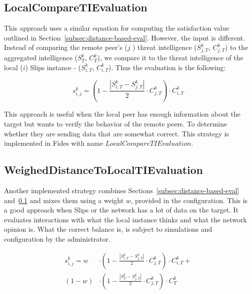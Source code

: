 \subsection{LocalCompareTIEvaluation}
\label{subsec:use-local-threat-to-evaluate}
This approach uses a similar equation for computing the satisfaction value outlined in Section~\ref{subsec:distance-based-eval}. However, the input is different. Instead of comparing the remote peer's ($j$ ) threat intelligence ($S^{k}_{j, T}$, $C^{k}_{j, T}$) to the aggregated intelligence ($S^{k}_{T}$, $C^{k}_{T}$), we compare it to the threat intelligence of the local ($i$) Slips instance - ($S^{k}_{i, T}$, $C^{k}_{i, T}$). Thus the evaluation is the following:

\begin{equation}
s^{k}_{i, j} = \left(1 - \frac{|{S}^{k}_{i, T} - S^{k}_{j, T}|}{2} \cdot C^{k}_{j, T}\right) \cdot C^{k}_{i, T}
\end{equation}

This approach is useful when the local peer has enough information about the target but wants to verify the behavior of the remote peers.
To determine whether they are sending data that are somewhat correct. This strategy is implemented in Fides with name $LocalCompareTIEvaluation$.

\subsection{WeighedDistanceToLocalTIEvaluation}
\label{subsec:weigh-local-opinion-with-aggregated-one}
Another implemented strategy combines Sections~\ref{subsec:distance-based-eval} and~\ref{subsec:use-local-threat-to-evaluate} and mixes them using a weight $w$, provided in the configuration.
This is a good approach when Slips or the network has a lot of data on the target. It evaluates interactions with what the local instance thinks and what the network opinion is.
What the correct balance is, is subject to simulations and configuration by the administrator.

\begin{equation}
\begin{split}
    s^{k}_{i, j} = w &\cdot \left(1 - \frac{|{S}^{k}_{i, T} - S^{k}_{j, T}|}{2} \cdot C^{k}_{j, T}\right) \cdot C^{k}_{i, T} + \\
    (1-w) &\cdot \left(1 - \frac{|{S}^{k}_{T} - S^{k}_{j, T}|}{2} \cdot C^{k}_{j, T}\right) \cdot C^{k}_{T}
\end{split}
\end{equation}

